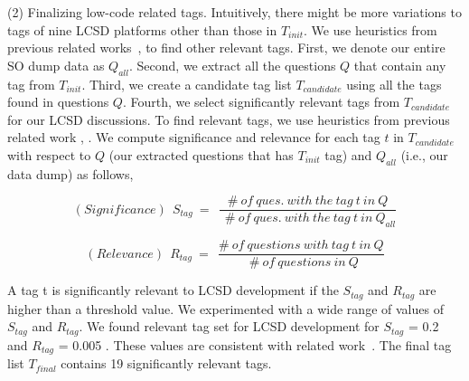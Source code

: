 (2) Finalizing low-code related tags.
Intuitively, there might be more variations to tags of nine  LCSD platforms other than those in $T_{init}$. We use heuristics from previous related works~\cite{bagherzadeh2019going},\cite{yang2016security} to find other relevant tags. First, we denote our entire SO dump data as $Q_{all}$. Second, we extract all the questions $Q$ that contain any tag from $T_{init}$. Third, we create a candidate tag list $T_{candidate}$ using all the tags found in questions $Q$. Fourth, we select significantly relevant tags from  $T_{candidate}$ for our  LCSD discussions. To find relevant tags, we use heuristics from previous related work \cite{bagherzadeh2019going}, \cite{yang2016security}. We compute significance and relevance for each tag $t$ in $T_{candidate}$ with respect to $Q$ (our extracted questions that has $T_{init}$ tag) and $Q_{all}$ (i.e., our data dump) as follows,
{ \[
( Significance) \ \ S_{tag} \ =\ \ \frac{\#\ of\ ques.\ with\ the\ tag\ t\ in\ Q}{\ \ \#\ of\ ques.\ with\ the\ tag\ t\ in\ Q_{all}}
\]

\[
( Relevance) \ \ R_{tag} \ =\ \ \frac{\#\ of\ questions\ with\ tag\ t\ in\ Q}{\ \ \#\ of\ questions\ in\ Q}
\]} A tag t is significantly relevant to  LCSD development if the $S_{tag}$ and  $R_{tag}$ are higher than a threshold value. We experimented with a wide range of values of $S_{tag}$ and  $R_{tag}$. We found relevant tag set for  LCSD development for $S_{tag}$ = 0.2 and $R_{tag}$ = 0.005 . These values are consistent with related work~\cite{Bagherzadeh-BigdataTopic-FSE2019,ahmed2018concurrency}. The final tag list $T_{final}$ contains 19 significantly relevant tags. 


